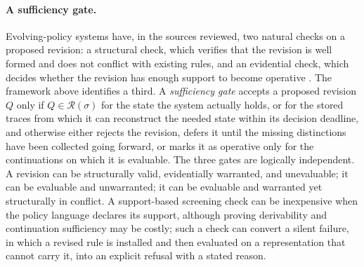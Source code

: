 \documentclass[11pt]{article}
\theoremstyle{definition}
\theoremstyle{remark}
\newcommand{\Hor}{\mathcal{R}}
\begin{document}
\paragraph{A sufficiency gate.}
Evolving-policy systems have, in the sources reviewed, two natural checks on a proposed revision: a structural check, which verifies that the revision is well formed and does not conflict with existing rules, and an evidential check, which decides whether the revision has enough support to become operative \cite{vepa}. The framework above identifies a third. A \emph{sufficiency gate} accepts a proposed revision $Q$ only if $Q\in\Hor(\sigma)$ for the state the system actually holds, or for the stored traces from which it can reconstruct the needed state within its decision deadline, and otherwise either rejects the revision, defers it until the missing distinctions have been collected going forward, or marks it as operative only for the continuations on which it is evaluable. The three gates are logically independent. A revision can be structurally valid, evidentially warranted, and unevaluable; it can be evaluable and unwarranted; it can be evaluable and warranted yet structurally in conflict. A support-based screening check can be inexpensive when the policy language declares its support, although proving derivability and continuation sufficiency may be costly; such a check can convert a silent failure, in which a revised rule is installed and then evaluated on a representation that cannot carry it, into an explicit refusal with a stated reason.
\end{document}
